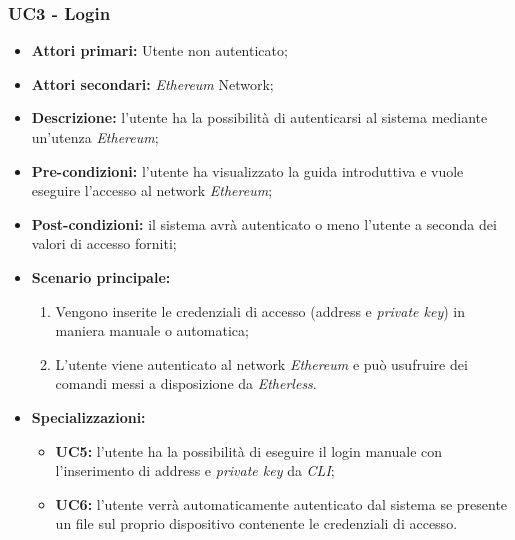 \subsubsection{UC3 - Login}
\begin{itemize}
	\item \textbf{Attori primari:} Utente non autenticato;
	\item \textbf{Attori secondari:} \textit{Ethereum\glo} Network;
	\item \textbf{Descrizione:} l'utente ha la possibilità di autenticarsi al sistema mediante un'utenza \textit{Ethereum\glos}; 
	\item \textbf{Pre-condizioni:} l'utente ha visualizzato la guida introduttiva e vuole eseguire l'accesso al network \textit{Ethereum\glos};
	\item \textbf{Post-condizioni:} il sistema avrà autenticato o meno l'utente a seconda dei valori di accesso forniti;
	\item \textbf{Scenario principale:} 
	\begin{enumerate}
		\item Vengono inserite le credenziali di accesso (address e \textit{private key\glos}) in maniera manuale o automatica;
		\item L'utente viene autenticato al network \textit{Ethereum\glo} e può usufruire dei comandi messi a disposizione da \textit{Etherless}.
	\end{enumerate}
	\item \textbf{Specializzazioni:}
	\begin{itemize}
		\item \textbf{UC5:} l'utente ha la possibilità di eseguire il login manuale con l'inserimento di address e \textit{private key\glo} da \textit{CLI\glos};
		\item \textbf{UC6:} l'utente verrà automaticamente autenticato dal sistema se presente un file sul proprio dispositivo contenente le credenziali di accesso.  
	\end{itemize}
\end{itemize}
